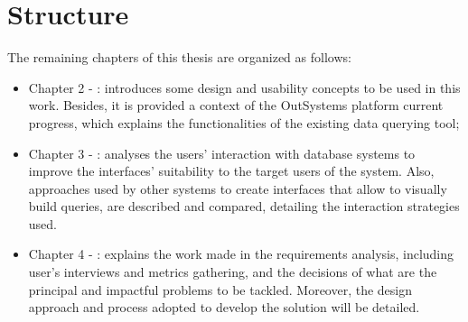 \section{Structure}
\label{sec:structure}

The remaining chapters of this thesis are organized as follows:

\begin{itemize}
  \item Chapter 2 - : introduces some design and usability concepts to be used in this work. Besides, it is provided a context of the OutSystems platform current progress, which explains the functionalities of the existing data querying tool;
  \item Chapter 3 - : analyses the users' interaction with database systems to improve the interfaces' suitability to the target users of the system. Also, approaches used by other systems to create interfaces that allow to visually build queries, are described and compared, detailing the interaction strategies used.
  \item Chapter 4 - : explains the work made in the requirements analysis, including user's interviews and metrics gathering, and the decisions of what are the principal and impactful problems to be tackled. Moreover, the design approach and process adopted to develop the solution will be detailed.
\end{itemize}

